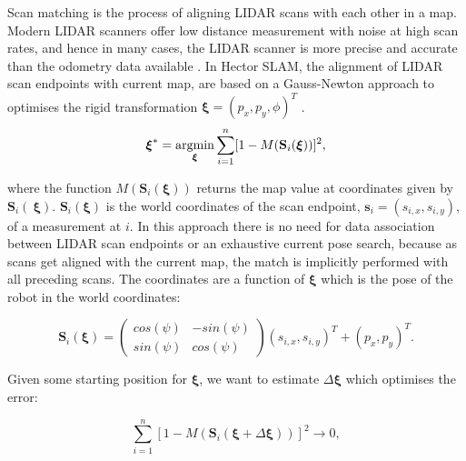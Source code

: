 Scan matching is the process of aligning LIDAR scans with each other in a map. Modern LIDAR scanners offer low distance measurement with noise at high scan rates, and hence in many cases, the LIDAR scanner is more precise and accurate than the odometry data available \cite{Kohlbrecher2011a}. In Hector SLAM, the alignment of LIDAR scan endpoints with current map, are based on a Gauss-Newton approach to optimises the rigid transformation $\boldsymbol{\xi} = (p_x, p_y, \phi)^T$ .
\begin{equation}
    \boldsymbol{\xi}^* = \argmin_{\boldsymbol{\xi}} \sum_{i=1}^{n}[1-M(\mathbf{S}_i(\boldsymbol{\xi}))]^2,
\label{eq:optimizedtransform}
\end{equation}

where the function $M(\mathbf{S}_i(\boldsymbol{\xi}))$ returns the map value at coordinates given by $\mathbf{S}_i(\
\boldsymbol{\xi})$. $\mathbf{S}_i(\boldsymbol{\xi})$ is the world coordinates of the scan endpoint, $\mathbf{s}_i = (s_{i,x}, s_{i,y})$, of a measurement at $i$. In this approach there is no need for data association between LIDAR scan endpoints or an exhaustive current pose search, because as scans get aligned with the current map, the match is implicitly performed with all preceding scans. The coordinates are a function of $\boldsymbol{\xi}$ which is the pose of the robot in the world coordinates:

\begin{equation}
    \mathbf{S}_i(\boldsymbol{\xi})=   \begin{pmatrix}
                    cos(\psi) & -sin(\psi) \\
                    sin(\psi) & cos(\psi)
                \end{pmatrix} (s_{i,x}, s_{i,y})^T + (p_x, p_y)^T.
\end{equation}

Given some starting position for $\boldsymbol{\xi}$, we want to estimate $\Delta\boldsymbol{\xi}$ which optimises the error: 

\begin{equation}
     \sum_{i=1}^{n}[ 1-M(\mathbf{S}_i(\boldsymbol{\xi} + \Delta\boldsymbol{\xi} ))]^ 2 \rightarrow 0,
\label{eq:error}
\end{equation}

